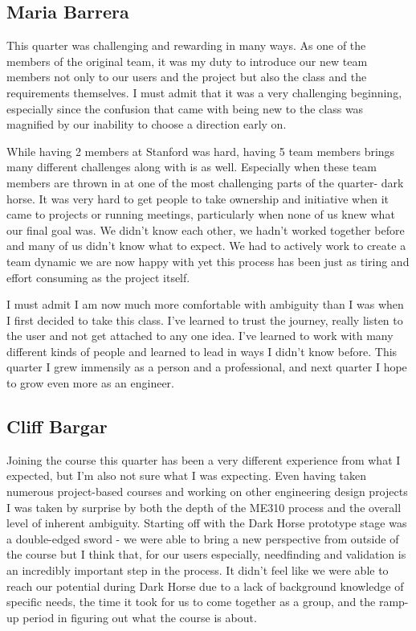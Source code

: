 \subsection{Maria Barrera}

This quarter was challenging and rewarding in many ways. As one of the members of the original team, it was my duty to introduce our new team members not only to our users and the project but also the class and the requirements themselves. I must admit that it was a very challenging beginning, especially since the confusion that came with being new to the class was magnified by our inability to choose a direction early on. 

While having 2 members at Stanford was hard, having 5 team members brings many different challenges along with is as well. Especially when these team members are thrown in at one of the most challenging parts of the quarter- dark horse. It was very hard to get people to take ownership and initiative when it came to projects or running meetings, particularly when none of us knew what our final goal was. We didn't know each other, we hadn't worked together before and many of us didn't know what to expect. We had to actively work to create a team dynamic we are now happy with yet this process has been just as tiring and effort consuming as the project itself. 

 I must admit I am now much more comfortable with ambiguity than I was when I first decided to take this class. I've learned to trust the journey, really listen to the user and not get attached to any one idea. I've learned to work with many different kinds of people and learned to lead in ways I didn't know before. This quarter I grew immensily as a person and a professional, and next quarter I hope to grow even more as an engineer. 

\subsection{Cliff Bargar}
Joining the course this quarter has been a very different experience from what I expected, but I'm also not sure what I was expecting. Even having taken numerous project-based courses and working on other engineering design projects I was taken by surprise by both the depth of the ME310 process and the overall level of inherent ambiguity. Starting off with the Dark Horse prototype stage was a double-edged sword - we were able to bring a new perspective from outside of the course but I think that, for our users especially, needfinding and validation is an incredibly important step in the process. It didn't feel like we were able to reach our potential during Dark Horse due to a lack of background knowledge of specific needs, the time it took for us to come together as a group, and the ramp-up period in figuring out what the course is about.

